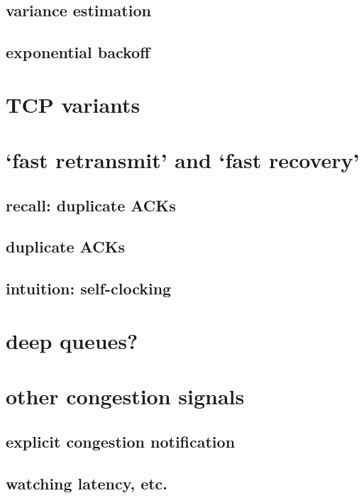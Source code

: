 \subsection{variance estimation}


\subsection{exponential backoff}


\section{TCP variants}



\section{`fast retransmit' and `fast recovery'}

\subsection{recall: duplicate ACKs}


\subsection{duplicate ACKs}


\subsection{intuition: self-clocking}



\section{deep queues?}


\section{other congestion signals}



\subsection{explicit congestion notification}


\subsection{watching latency, etc.}


